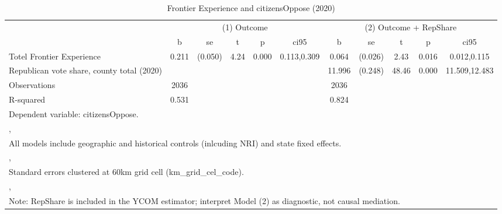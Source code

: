 \begin{table}[htbp]\centering
\def\sym#1{\ifmmode^{#1}\else\(^{#1}\)\fi}
\caption{Frontier Experience and citizensOppose (2020)}
\begin{tabular}{l*{2}{ccccc}}
\hline\hline
                &\multicolumn{5}{c}{(1) Outcome}                  &\multicolumn{5}{c}{(2) Outcome + RepShare}       \\
                &        b&       se&        t&        p&     ci95&        b&       se&        t&        p&     ci95\\
\hline
Totel Frontier Experience&    0.211&  (0.050)&     4.24&    0.000&0.113,0.309&    0.064&  (0.026)&     2.43&    0.016&0.012,0.115\\
Republican vote share, county total (2020)&         &         &         &         &         &   11.996&  (0.248)&    48.46&    0.000&11.509,12.483\\
\hline
Observations    &     2036&         &         &         &         &     2036&         &         &         &         \\
R-squared       &    0.531&         &         &         &         &    0.824&         &         &         &         \\
\hline\hline
\multicolumn{11}{l}{\footnotesize Dependent variable: citizensOppose.}\\
\multicolumn{11}{l}{\footnotesize ,}\\
\multicolumn{11}{l}{\footnotesize All models include geographic and historical controls (inlcuding NRI) and state fixed effects.}\\
\multicolumn{11}{l}{\footnotesize ,}\\
\multicolumn{11}{l}{\footnotesize Standard errors clustered at 60km grid cell (km\_grid\_cel\_code).}\\
\multicolumn{11}{l}{\footnotesize ,}\\
\multicolumn{11}{l}{\footnotesize Note: RepShare is included in the YCOM estimator; interpret Model (2) as diagnostic, not causal mediation.}\\
\end{tabular}
\end{table}
